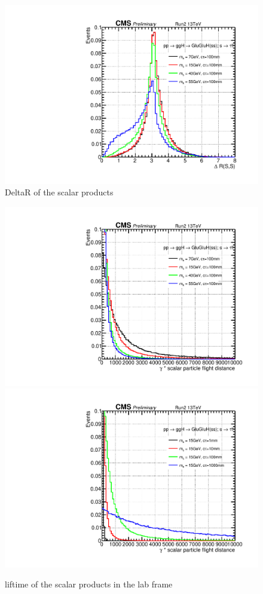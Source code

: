 \begin{figure}[h!]
  \caption{DeltaR of the scalar products}
  \label{fig:scalarpt}
  \centering
  \includegraphics[width=0.5\linewidth]{figs/Scalar_dR100mm.pdf}
\end{figure}

\begin{figure}[h!]
  \caption{liftime of the scalar products in the lab frame}
  \label{fig:scalarpt}
  \centering
  \includegraphics[width=0.57\linewidth]{figs/Scalar_gammactau100mm.pdf}
  \includegraphics[width=0.57\linewidth]{figs/Scalar_gammactau15GeV.pdf}
\end{figure}


